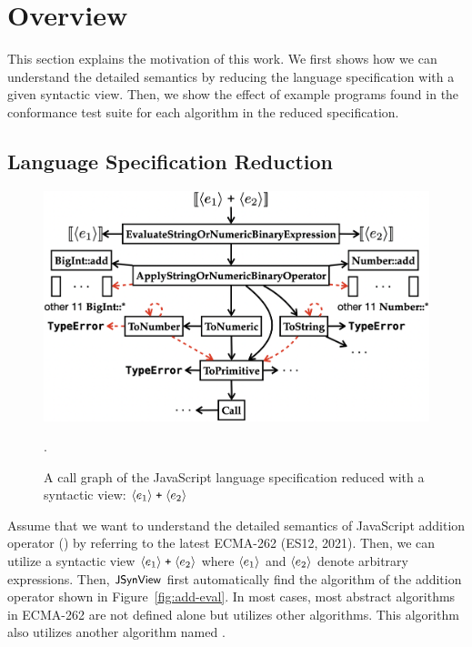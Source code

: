 \section{Overview}\label{sec:overview}


This section explains the motivation of this work.  We first shows how we can
understand the detailed semantics by reducing the language specification with a
given syntactic view.  Then, we show the effect of example programs found in the
conformance test suite for each algorithm in the reduced specification.


\subsection{Language Specification Reduction}\label{sec:reduce-spec}

\begin{figure}
  \centering
  \includegraphics[width=\columnwidth]{img/add-basic.png}
  \caption{A call graph of the JavaScript language specification reduced with a
  syntactic view: $\langle e_1 \rangle \; \texttt{+} \; \langle e_2 \rangle$}
  \label{fig:add-basic}.
\end{figure}

Assume that we want to understand the detailed semantics of JavaScript addition
operator (\code{+}) by referring to the latest ECMA-262 (ES12, 2021).  Then, we
can utilize a syntactic view $\langle e_1 \rangle \; \texttt{+} \; \langle e_2 \rangle$
where $\langle e_1 \rangle$ and $\langle e_2 \rangle$ denote arbitrary expressions.
Then, $\textsf{\small JSynView}$ first automatically find the  algorithm of the
addition operator shown in Figure~\ref{fig:add-eval}.  In most cases, most
abstract algorithms in ECMA-262 are not defined alone but utilizes other
algorithms.  This algorithm also utilizes another algorithm named
.

